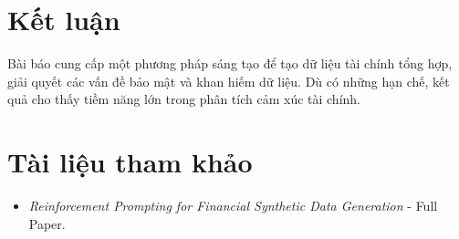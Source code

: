 \documentclass[a4paper,12pt]{article}
\begin{document}
\section{Kết luận}
Bài báo cung cấp một phương pháp sáng tạo để tạo dữ liệu tài chính tổng hợp, giải quyết các vấn đề bảo mật và khan hiếm dữ liệu. Dù có những hạn chế, kết quả cho thấy tiềm năng lớn trong phân tích cảm xúc tài chính.

\section{Tài liệu tham khảo}
\begin{itemize}
    \item \textit{Reinforcement Prompting for Financial Synthetic Data Generation} - Full Paper.
\end{itemize}
\end{document}
